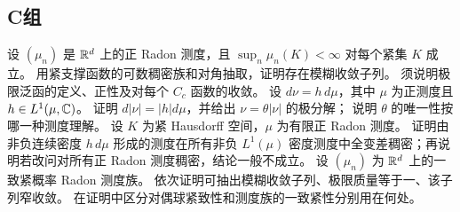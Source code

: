 \subsection*{C组}
\begin{enumerate}[label=\textbf{\thechapter.\arabic*.},resume]
设 \((\mu_n)\) 是 \(\mathbb{R}^d\) 上的正 Radon 测度，且
\(\sup_n\mu_n(K)<\infty\) 对每个紧集 \(K\) 成立。
用紧支撑函数的可数稠密族和对角抽取，证明存在模糊收敛子列。
须说明极限泛函的定义、正性及对每个 \(C_c\) 函数的收敛。
设 \(d\nu=h\,d\mu\)，其中 \(\mu\) 为正测度且 \(h\in L^1(\mu,\mathbb{C})\)。
证明 \(d|\nu|=|h|d\mu\)，并给出 \(\nu=\theta|\nu|\) 的极分解；
说明 \(\theta\) 的唯一性按哪一种测度理解。
设 \(K\) 为紧 Hausdorff 空间，\(\mu\) 为有限正 Radon 测度。
证明由非负连续密度 \(h\,d\mu\) 形成的测度在所有非负
\(L^1(\mu)\) 密度测度中全变差稠密；再说明若改问对所有正 Radon
测度稠密，结论一般不成立。
设 \((\mu_n)\) 为 \(\mathbb{R}^d\) 上的一致紧概率 Radon 测度族。
依次证明可抽出模糊收敛子列、极限质量等于一、该子列窄收敛。
在证明中区分对偶球紧致性和测度族的一致紧性分别用在何处。
\end{enumerate}
